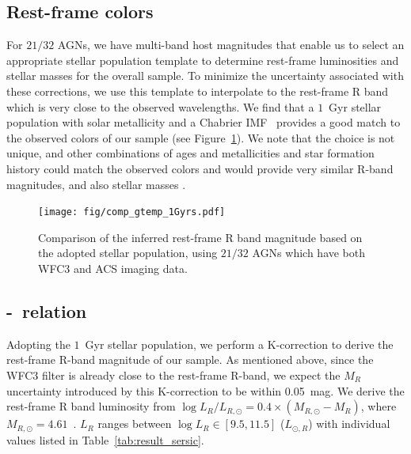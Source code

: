 \documentclass[apj]{emulateapj}
\begin{document}

\subsection{Rest-frame colors}

For $21/32$ AGNs, we have multi-band host magnitudes that enable us to select an appropriate stellar population template to determine rest-frame luminosities and stellar masses for the overall sample. To minimize the uncertainty associated with these corrections, we use this template to interpolate to the rest-frame R band which is very close to the observed wavelengths.  We find that a $1$~Gyr stellar population with solar metallicity and a Chabrier IMF~\citep{Bruzual2003} provides a good match to the observed colors of our sample (see Figure~\ref{fig:compare_temp}). We note that the choice is not unique, and other combinations of ages and metallicities and star formation history could match the observed colors and would provide very similar R-band magnitudes, and also stellar masses \citep{Bell2000, Bell2001}. %

\begin{figure}
\centering
{\texttt{[image: fig/comp\_gtemp\_1Gyrs.pdf]}}
\caption{\label{fig:compare_temp} 
Comparison of the inferred rest-frame R band magnitude based on the adopted stellar population, using $21/32$ AGNs which have both WFC3 and ACS imaging data.
}
\end{figure} 
 
\subsection{\mbh-\lhost\ relation}\label{sec:ml}

Adopting the $1$~Gyr stellar population, we perform a K-correction to derive the rest-frame R-band magnitude of our sample. As mentioned above, since the WFC3 filter is already close to the rest-frame R-band, we expect the $M_R$ uncertainty introduced by this K-correction to be within 0.05~mag. We derive the rest-frame R band luminosity from $\log L_R/L_{R, \odot} = 0.4\times(M_{R, \odot}-M_R)$, where $M_{R, \odot}=4.61$~\citep{Blanton07}. $L_R$ ranges between $\log L_R \in [9.5, 11.5]$ ($L_{\odot,R}$) with individual values listed in Table~\ref{tab:result_sersic}. 
\end{document}
